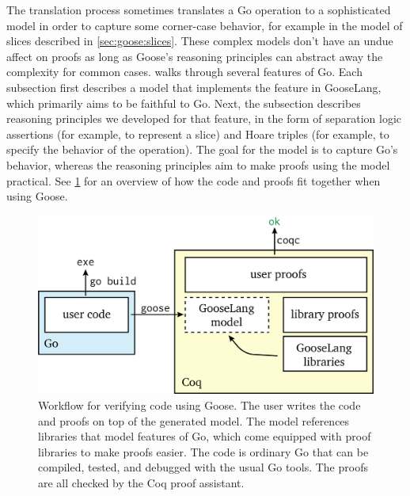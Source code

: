 The translation process sometimes translates a Go operation to a sophisticated
model in order to capture some corner-case behavior, for example in the model of
slices described in \cref{sec:goose:slices}. These complex models don't have an
undue affect on proofs as long as Goose's reasoning principles can abstract away
the complexity for common cases. 
walks through several features of Go. Each subsection first describes a model that
implements the feature in GooseLang, which primarily aims to
be faithful to Go. Next, the subsection describes reasoning principles we developed for that
feature, in the form of separation logic assertions (for example, to
represent a slice) and Hoare triples (for example, to specify the
behavior of the  operation). The goal for the model is to capture
Go's behavior, whereas the reasoning
principles aim to make proofs using the model practical. See
\cref{fig:goose:workflow} for an overview of how
the code and proofs fit together when using Goose.

\begin{figure}
  \includegraphics{fig/goose-proofs.png}
  \caption[Workflow for verifying code with Goose]%
  {Workflow for verifying code using Goose. The user writes the code and
    proofs on top of the generated model. The model references libraries that
    model features of Go, which come equipped with proof libraries to make
    proofs easier. The code is ordinary Go that can be compiled, tested, and
    debugged with the usual Go tools. The proofs are all checked by the Coq
    proof assistant.}
  \label{fig:goose:workflow}
\end{figure}
